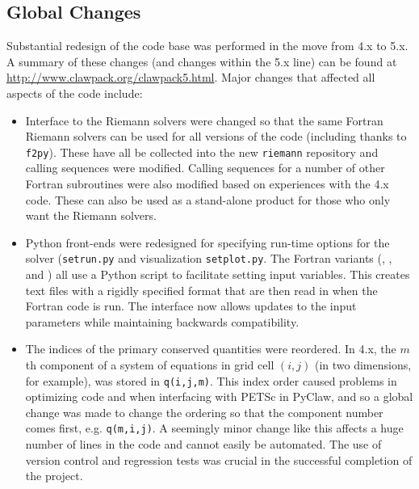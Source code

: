 %
%
%

\subsection{Global Changes}
Substantial redesign of the \clawpack code base was performed in the move
from \clawpack 4.x to 5.x.  A summary of these changes (and changes within
the 5.x line) can be found at \url{http://www.clawpack.org/clawpack5.html}.
Major changes that affected all aspects of the code include:
\begin{itemize}
    \item Interface to the Riemann solvers were changed so that the same Fortran
    Riemann solvers can be used for all versions of the code (including \pyclaw
    thanks to \texttt{f2py}).  These have all be collected into the new
    \texttt{riemann} repository and calling sequences were modified.  Calling
    sequences for a number of other Fortran subroutines were also modified based
    on experiences with the \clawpack 4.x code.  These can also be used as a
    stand-alone product for those who only want the Riemann solvers.
    \item Python front-ends were redesigned for specifying run-time options for
    the solver (\texttt{setrun.py} and visualization \texttt{setplot.py}.  The
    Fortran variants (\classic, \amrclaw, and \geoclaw) all use a Python script
    to facilitate setting input variables.  This creates text files with a
    rigidly specified format that are then read in when the Fortran code is run.
    The interface now allows updates to the input parameters while maintaining
    backwards compatibility.
    \item The indices of the primary conserved quantities were reordered.  In
    \clawpack 4.x, the $m$th component of a
    system of equations in grid cell $(i,j)$ (in two dimensions, for example),
    was stored in \texttt{q(i,j,m)}.  This index order caused problems in
    optimizing code and when interfacing with PETSc in PyClaw, and so a global
    change was made to change the ordering so that the component number comes
    first, e.g. \texttt{q(m,i,j)}.  A seemingly minor change like this affects a
    huge number of lines in the code and cannot easily be automated. The use of
    version control and regression tests was crucial in the successful
    completion of the project.
\end{itemize}
